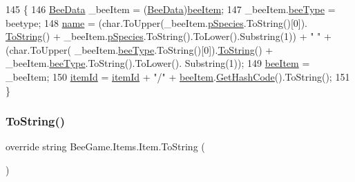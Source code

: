 \begin{DoxyCode}
145         \{
146             \hyperlink{struct_bee_game_1_1_bee_1_1_bee_data}{BeeData} \_beeItem = (\hyperlink{struct_bee_game_1_1_bee_1_1_bee_data}{BeeData})\hyperlink{struct_bee_game_1_1_items_1_1_item_a0593f3b7b3ff5daa864f3c6d0ccd77ca}{beeItem};
147             \_beeItem.\hyperlink{struct_bee_game_1_1_bee_1_1_bee_data_acfb6e209ae7bd1b52928580fcce4c743}{beeType} = beetype;
148             \hyperlink{struct_bee_game_1_1_items_1_1_item_a0b0bd7eb510757f650f1be3d05b23fc8}{name} = (\textcolor{keywordtype}{char}.ToUpper(\_beeItem.\hyperlink{struct_bee_game_1_1_bee_1_1_bee_data_a87db9add2bcc463ab444eb4ac7a4e228}{pSpecies}.ToString()[0]).
      \hyperlink{struct_bee_game_1_1_items_1_1_item_ac8039eff360bc9120180a54a0aaf13d8}{ToString}() + \_beeItem.\hyperlink{struct_bee_game_1_1_bee_1_1_bee_data_a87db9add2bcc463ab444eb4ac7a4e228}{pSpecies}.ToString().ToLower().Substring(1)) + \textcolor{stringliteral}{" "} + (\textcolor{keywordtype}{char}.ToUpper(
      \_beeItem.\hyperlink{struct_bee_game_1_1_bee_1_1_bee_data_acfb6e209ae7bd1b52928580fcce4c743}{beeType}.ToString()[0]).\hyperlink{struct_bee_game_1_1_items_1_1_item_ac8039eff360bc9120180a54a0aaf13d8}{ToString}() + \_beeItem.\hyperlink{struct_bee_game_1_1_bee_1_1_bee_data_acfb6e209ae7bd1b52928580fcce4c743}{beeType}.ToString().ToLower().
      Substring(1));
149             \hyperlink{struct_bee_game_1_1_items_1_1_item_a0593f3b7b3ff5daa864f3c6d0ccd77ca}{beeItem} = \_beeItem;
150             \hyperlink{struct_bee_game_1_1_items_1_1_item_aa85bfeab893271c26f8ca41b638ada1c}{itemId} = \hyperlink{struct_bee_game_1_1_items_1_1_item_aa85bfeab893271c26f8ca41b638ada1c}{itemId} + \textcolor{stringliteral}{"/"} + \hyperlink{struct_bee_game_1_1_items_1_1_item_a0593f3b7b3ff5daa864f3c6d0ccd77ca}{beeItem}.\hyperlink{struct_bee_game_1_1_bee_1_1_bee_data_ab11b7e2d244cb0021c52ae0b839ff6c3}{GetHashCode}().ToString();
151         \}
\end{DoxyCode}
\mbox{\label{struct_bee_game_1_1_items_1_1_item_ac8039eff360bc9120180a54a0aaf13d8}} 
\subsubsection{\texorpdfstring{To\+String()}{ToString()}}
{\footnotesize\ttfamily override string Bee\+Game.\+Items.\+Item.\+To\+String (\begin{DoxyParamCaption}{ }\end{DoxyParamCaption})}



